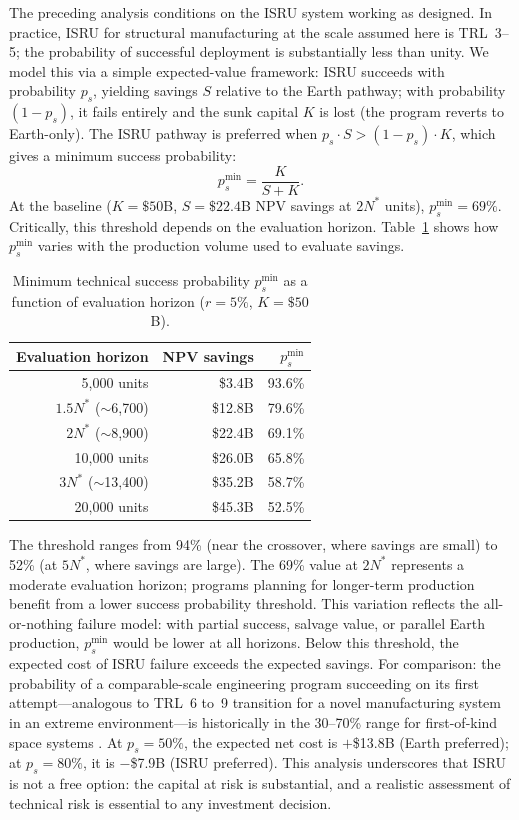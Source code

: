 \documentclass[preprint,12pt]{elsarticle}
\begin{document}
The preceding analysis conditions on the ISRU system working as designed. In practice, ISRU for structural manufacturing at the scale assumed here is TRL~3--5; the probability of successful deployment is substantially less than unity. We model this via a simple expected-value framework: ISRU succeeds with probability $p_s$, yielding savings $S$ relative to the Earth pathway; with probability $(1 - p_s)$, it fails entirely and the sunk capital $K$ is lost (the program reverts to Earth-only). The ISRU pathway is preferred when $p_s \cdot S > (1 - p_s) \cdot K$, which gives a minimum success probability:
\begin{equation}
  p_s^{\min} = \frac{K}{S + K}.
  \label{eq:p_success}
\end{equation}
At the baseline ($K = \$50$B, $S = \$22.4$B NPV savings at $2N^*$ units), $p_s^{\min} = 69\%$. Critically, this threshold depends on the evaluation horizon. Table~\ref{tab:ps_horizon} shows how $p_s^{\min}$ varies with the production volume used to evaluate savings.

\begin{table}[htbp]
\centering
\caption{Minimum technical success probability $p_s^{\min}$ as a function of evaluation horizon ($r = 5\%$, $K = \$50$B).}
\label{tab:ps_horizon}
\small
\begin{tabular}{@{}rrr@{}}
\toprule
Evaluation horizon & NPV savings & $p_s^{\min}$ \\
\midrule
5{,}000 units            & \$3.4B   & 93.6\% \\
$1.5 N^*$ ($\sim$6{,}700) & \$12.8B  & 79.6\% \\
$2 N^*$ ($\sim$8{,}900)   & \$22.4B  & 69.1\% \\
10{,}000 units           & \$26.0B  & 65.8\% \\
$3 N^*$ ($\sim$13{,}400)  & \$35.2B  & 58.7\% \\
20{,}000 units           & \$45.3B  & 52.5\% \\
\bottomrule
\end{tabular}
\end{table}

The threshold ranges from 94\% (near the crossover, where savings are small) to 52\% (at $5N^*$, where savings are large). The 69\% value at $2N^*$ represents a moderate evaluation horizon; programs planning for longer-term production benefit from a lower success probability threshold. This variation reflects the all-or-nothing failure model: with partial success, salvage value, or parallel Earth production, $p_s^{\min}$ would be lower at all horizons. Below this threshold, the expected cost of ISRU failure exceeds the expected savings. For comparison: the probability of a comparable-scale engineering program succeeding on its first attempt---analogous to TRL~6 to~9 transition for a novel manufacturing system in an extreme environment---is historically in the 30--70\% range for first-of-kind space systems \cite{wertz2011}. At $p_s = 50\%$, the expected net cost is $+$\$13.8B (Earth preferred); at $p_s = 80\%$, it is $-$\$7.9B (ISRU preferred). This analysis underscores that ISRU is not a free option: the capital at risk is substantial, and a realistic assessment of technical risk is essential to any investment decision.
\end{document}
